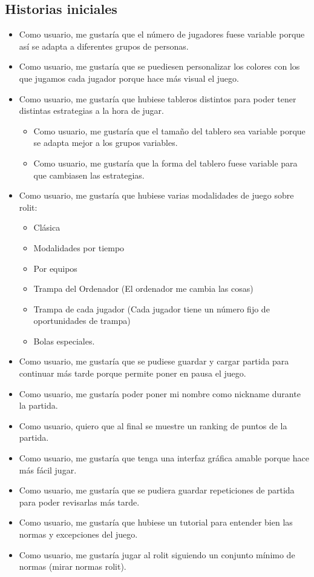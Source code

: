 \documentclass[../../SCRUM.tex]{subfiles}
\begin{document}
\subsection{Historias iniciales}
\begin{itemize}
\item
  Como usuario, me gustaría que el número de jugadores fuese variable
  porque así se adapta a diferentes grupos de personas.
\item
  Como usuario, me gustaría que se puediesen personalizar los colores
  con los que jugamos cada jugador porque hace más visual el juego.
\item
  Como usuario, me gustaría que hubiese tableros distintos para poder
  tener distintas estrategias a la hora de jugar.

  \begin{itemize}
  \item
    Como usuario, me gustaría que el tamaño del tablero sea variable
    porque se adapta mejor a los grupos variables.
  \item
    Como usuario, me gustaría que la forma del tablero fuese variable
    para que cambiasen las estrategias.
  \end{itemize}
\item
  Como usuario, me gustaría que hubiese varias modalidades de juego
  sobre rolit:

  \begin{itemize}
  \item
    Clásica
  \item
    Modalidades por tiempo
  \item
    Por equipos
  \item
    Trampa del Ordenador (El ordenador me cambia las cosas)
  \item
    Trampa de cada jugador (Cada jugador tiene un número fijo de
    oportunidades de trampa)
  \item
    Bolas especiales.
  \end{itemize}
\item
  Como usuario, me gustaría que se pudiese guardar y cargar partida para
  continuar más tarde porque permite poner en pausa el juego.
\item
  Como usuario, me gustaría poder poner mi nombre como nickname durante
  la partida.
\item
  Como usuario, quiero que al final se muestre un ranking de puntos de
  la partida.
\item
  Como usuario, me gustaría que tenga una interfaz gráfica amable porque
  hace más fácil jugar.
\item
  Como usuario, me gustaría que se pudiera guardar repeticiones de
  partida para poder revisarlas más tarde.
\item
  Como usuario, me gustaría que hubiese un tutorial para entender bien
  las normas y excepciones del juego.
\item
  Como usuario, me gustaría jugar al rolit siguiendo un conjunto mínimo
  de normas (mirar normas rolit).
\end{itemize}
\end{document}
